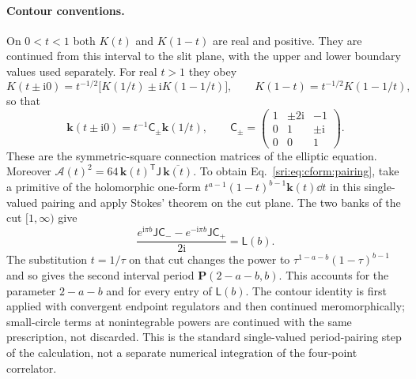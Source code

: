 \paragraph{Contour conventions.} On $0<t<1$ both $K(t)$ and $K(1-t)$ are real and positive. They are continued from this
interval to the slit plane, with the upper and lower boundary values used separately. For real $t>1$ they obey
\begin{equation}
 K(t\pm\mathrm i0)=t^{-1/2}\bigl[K(1/t)\pm\mathrm iK(1-1/t)\bigr],\qquad K(1-t)=t^{-1/2}K(1-1/t),
\end{equation}
so that
\begin{equation}
 \mathbf k(t\pm\mathrm i0)=t^{-1}\mathsf C_\pm\mathbf k(1/t),\qquad
 \mathsf C_\pm=\begin{pmatrix}1&\pm2\mathrm i&-1\\0&1&\pm\mathrm i\\0&0&1\end{pmatrix}.
 \label{sri:eq:cform:boundary}
\end{equation}
These are the symmetric-square connection matrices of the elliptic equation. Moreover
$\mathcal A(t)^2=64\,\mathbf k(t)^{\mathsf T}\mathsf J\,\overline{\mathbf k(t)}$. To obtain
Eq.~\eqref{sri:eq:cform:pairing}, take a primitive of the holomorphic one-form $t^{a-1}(1-t)^{b-1}\mathbf k(t)\dd t$ in
this single-valued pairing and apply Stokes' theorem on the cut plane. The two banks of the cut $[1,\infty)$ give
\begin{equation}
 \frac{e^{\mathrm i\pi b}\mathsf J\mathsf C_--e^{-\mathrm i\pi b}\mathsf J\mathsf C_+}{2\mathrm i}=\mathsf L(b).
\end{equation}
The substitution $t=1/\tau$ on that cut changes the power to $\tau^{1-a-b}(1-\tau)^{b-1}$ and so gives the second
interval period $\mathbf P(2-a-b,b)$. This accounts for the parameter $2-a-b$ and for every entry of $\mathsf L(b)$.
The contour identity is first applied with convergent endpoint regulators and then continued meromorphically;
small-circle terms at nonintegrable powers are continued with the same prescription, not discarded. This is the
standard single-valued period-pairing step of the calculation, not a separate numerical integration of the four-point
correlator.

